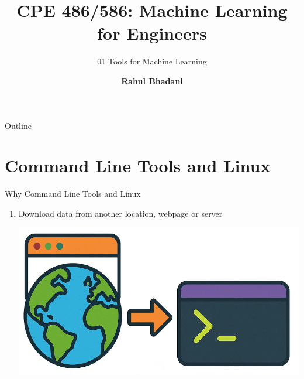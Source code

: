 \documentclass[aspectratio=169,xcolor=dvipsnames,svgnames,x11names,fleqn]{beamer}
\title[CPE 486/586: Machine Learning]{CPE 486/586: Machine Learning for Engineers} %
\subtitle{01 Tools for Machine Learning}
\author[Rahul Bhadani] {{\Large \textbf{Rahul Bhadani}}}
\institute[UAH] %
{
    Electrical \& Computer Engineering,  The University of Alabama in Huntsville
}
\date
\begin{document}
\begin{frame}
  \titlepage
\end{frame}

\begin{frame}{Outline}
   \tableofcontents
\end{frame}



\section{Command Line Tools and Linux}

\begin{frame}
    \sectionpage
\end{frame}

\begin{frame}{Why Command Line Tools and Linux}

\begin{enumerate}
    \item Download data from another location, webpage or server \begin{center}
\includegraphics[height=.4\textheight]{figures/cmd_line_download.png}
\end{center}
\end{enumerate}
    
\end{frame}
\end{document}
